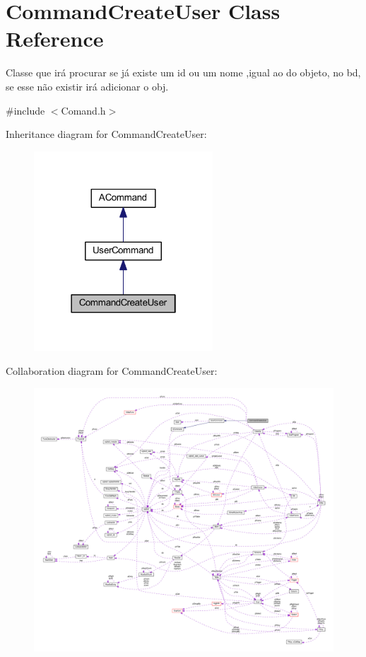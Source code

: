 \hypertarget{class_command_create_user}{\section{Command\-Create\-User Class Reference}
\label{class_command_create_user}
}


Classe que irá procurar se já existe um id ou um nome ,igual ao do objeto, no bd, se esse não existir irá adicionar o obj.  




{\ttfamily \#include $<$Comand.\-h$>$}



Inheritance diagram for Command\-Create\-User\-:\nopagebreak
\begin{figure}[H]
\begin{center}
\leavevmode
\includegraphics[width=190pt]{class_command_create_user__inherit__graph}
\end{center}
\end{figure}


Collaboration diagram for Command\-Create\-User\-:\nopagebreak
\begin{figure}[H]
\begin{center}
\leavevmode
\includegraphics[width=350pt]{class_command_create_user__coll__graph}
\end{center}
\end{figure}
